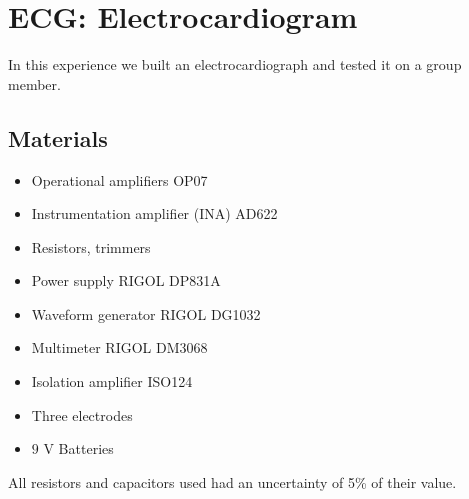 \chapter{ECG: Electrocardiogram}
In this experience we built an electrocardiograph and tested it on a group member.

\section{Materials}
\begin{itemize}
\item Operational amplifiers OP07
\item Instrumentation amplifier (INA) AD622
\item Resistors, trimmers
\item Power supply RIGOL DP831A
\item Waveform generator RIGOL DG1032
\item Multimeter RIGOL DM3068
\item Isolation amplifier ISO124
\item Three electrodes
\item $9$ V Batteries
\end{itemize}
All resistors and capacitors used had  an uncertainty of 5\% of their value.

